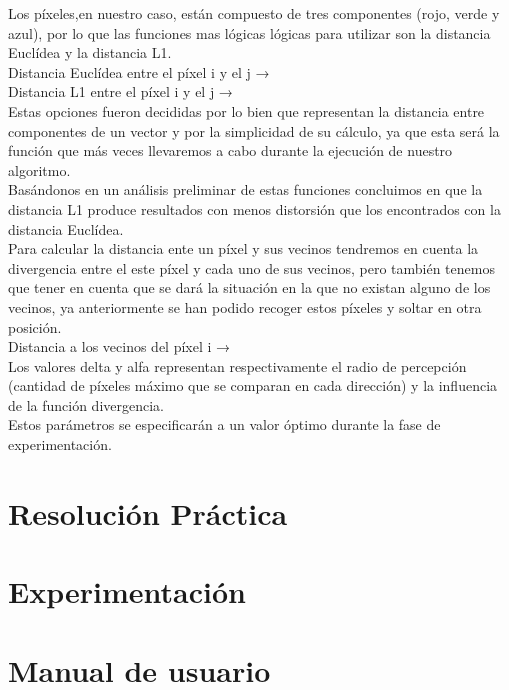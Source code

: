 \documentclass{pid}
\begin{document}
Los píxeles,en nuestro caso, están compuesto de tres componentes (rojo, verde y azul), por lo que las funciones mas lógicas lógicas para utilizar son la distancia Euclídea y la distancia L1.\\

Distancia Euclídea entre el píxel i y el j → \\ 
Distancia L1 entre el píxel i y el j  → \\

Estas opciones fueron decididas por lo bien que representan la distancia entre componentes de un vector y por la simplicidad de su cálculo, ya que esta será la función que más veces llevaremos a cabo durante la ejecución de nuestro algoritmo.\\

Basándonos en un análisis preliminar de estas funciones concluimos en que la distancia L1 produce resultados con menos distorsión que los encontrados con la distancia Euclídea.\\

Para calcular la distancia ente un píxel y sus vecinos tendremos en cuenta la divergencia entre el este píxel y cada uno de sus vecinos,  pero también tenemos que tener en cuenta que se dará la situación en la que no existan alguno de los vecinos, ya anteriormente se han podido recoger estos píxeles y soltar en otra posición.\\

Distancia a los vecinos del píxel i → \\

Los valores delta y alfa representan respectivamente el radio de percepción (cantidad de píxeles máximo que se comparan en cada dirección) y la influencia de la función divergencia.\\

Estos parámetros se especificarán a un valor óptimo durante la fase de experimentación.\\
\section{Resolución Práctica}

\section{Experimentación}

\section{Manual de usuario}
\end{document}
